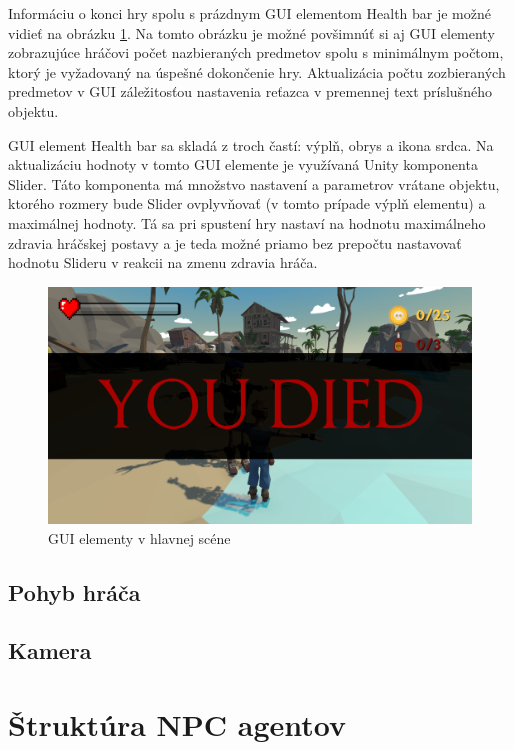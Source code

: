 \documentclass[slovak, master]{diploma}
\begin{document}
Informáciu o konci hry spolu s prázdnym GUI elementom Health bar je možné vidieť na obrázku \ref{pic:YouDied}. Na tomto obrázku je možné povšimnúť si aj GUI elementy zobrazujúce hráčovi počet nazbieraných predmetov spolu s minimálnym počtom, ktorý je vyžadovaný na úspešné dokončenie hry. Aktualizácia počtu zozbieraných predmetov v GUI záležitosťou nastavenia reťazca v premennej text príslušného objektu. 

GUI element Health bar sa skladá z troch častí: výplň, obrys a ikona srdca. Na aktualizáciu hodnoty v tomto GUI elemente je využívaná Unity komponenta Slider. Táto komponenta má množstvo nastavení a parametrov vrátane objektu, ktorého rozmery bude Slider ovplyvňovať (v tomto prípade výplň elementu) a maximálnej hodnoty. Tá sa pri spustení hry nastaví na hodnotu maximálneho zdravia hráčskej postavy a je teda možné priamo bez prepočtu nastavovať hodnotu Slideru v reakcii na zmenu zdravia hráča.

\begin{figure}[!htbp]
	\centering
	\includegraphics[width=.8\textwidth]{Figures/youDied.png}
	\caption{GUI elementy v hlavnej scéne}
	\label{pic:YouDied}
\end{figure}

\subsection{Pohyb hráča}
\label{sec:PlayerMovement} 

\subsection{Kamera}
\label{sec:Camera}



\section{Štruktúra NPC agentov}
\label{sec:Agents}
\end{document}
